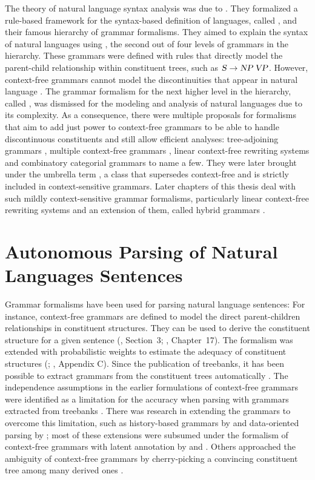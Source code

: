 \documentclass[../document.tex]{subfiles}
\begin{document}
    The theory of natural language syntax analysis was due to \citet{Cho56}.
    They formalized a rule-based framework for the syntax-based definition of languages, called , and their famous hierarchy of grammar formalisms.
    They aimed to explain the syntax of natural languages using , the second out of four levels of grammars in the hierarchy.
    These grammars were defined with rules that directly model the parent-child relationship within constituent trees, such as \(\textsc{\textsl{S}} \to \textsc{\textsl{NP}}\,\textsc{\textsl{VP}}\).
    However, context-free grammars cannot model the discontinuities that appear in natural language \citep{Shieber85}.
    The grammar formalism for the next higher level in the hierarchy, called , was dismissed for the modeling and analysis of natural languages due to its complexity.
    As a consequence, there were multiple proposals for formalisms that aim to add just power to context-free grammars to be able to handle discontinuous constituents and still allow efficient analyses:
        tree-adjoining grammars \citep{JosLevTak75}, multiple context-free grammars \citep{SekMatFujKas91}, linear context-free rewriting systems \citep{VijWeiJos87} and combinatory categorial grammars \citep{Ste11} to name a few.
    They were later brought under the umbrella term , a class that supersedes context-free and is strictly included in context-sensitive grammars.
    Later chapters of this thesis deal with such mildly context-sensitive grammar formalisms, particularly linear context-free rewriting systems and an extension of them, called hybrid grammars \citep{Ned14}.

    \section*{Autonomous Parsing of Natural Languages Sentences}
    Grammar formalisms have been used for parsing natural language sentences:
        For instance, context-free grammars are defined to model the direct parent-children relationships in constituent structures.
        They can be used to derive the constituent structure for a given sentence (\citealp{Cho56}, Section~3; \citealp{Jur23}, Chapter~17).
        The formalism was extended with probabilistic weights to estimate the adequacy of constituent structures (\citealp{Sup72}; \citealp{Jur23}, Appendix C).
    Since the publication of treebanks, it has been possible to extract grammars from the constituent trees automatically \citep{Cha96}.
    The independence assumptions in the earlier formulations of context-free grammars were identified as a limitation for the accuracy when parsing with grammars extracted from treebanks \citep[e.g.\@][Section~1.1]{collins2001convolution}.
    There was research in extending the grammars to overcome this limitation, such as history-based grammars by \citet{Black94} and data-oriented parsing by \citet{Bod92}; most of these extensions were subsumed under the formalism of context-free grammars with latent annotation by \citet{Mat05} and \citet{Petrov06}.
    Others approached the ambiguity of context-free grammars by cherry-picking a convincing constituent tree among many derived ones \citep{Col00}.
\end{document}
